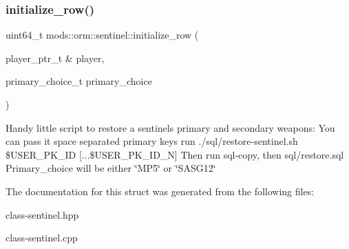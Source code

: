 \subsubsection{\texorpdfstring{initialize\+\_\+row()}{initialize\_row()}}
{\footnotesize\ttfamily uint64\+\_\+t mods\+::orm\+::sentinel\+::initialize\+\_\+row (\begin{DoxyParamCaption}\item[{player\+\_\+ptr\+\_\+t \&}]{player,  }\item[{primary\+\_\+choice\+\_\+t}]{primary\+\_\+choice }\end{DoxyParamCaption})}

Handy little script to restore a sentinel\textquotesingle{}s primary and secondary weapons\+: You can pass it space separated primary keys run ./sql/restore-\/sentinel.sh \$\+U\+S\+E\+R\+\_\+\+P\+K\+\_\+\+ID \mbox{[}...\$\+U\+S\+E\+R\+\_\+\+P\+K\+\_\+\+I\+D\+\_\+N\mbox{]} Then run sql-\/copy, then  sql/restore.\+sql Primary\+\_\+choice will be either \char`\"{}\+M\+P5\char`\"{} or \char`\"{}\+S\+A\+S\+G12\char`\"{} 

The documentation for this struct was generated from the following files\+:\begin{DoxyCompactItemize}
\item 
class-\/sentinel.\+hpp\item 
class-\/sentinel.\+cpp\end{DoxyCompactItemize}
